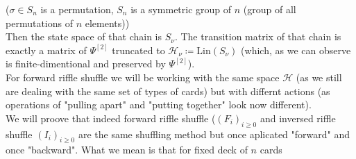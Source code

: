 \documentclass[a4paper, 12pt]{report}
\begin{document}
($\sigma \in S_n$ is a permutation, $S_n$ is a symmetric group of $n$ (group of 
all permutations of $n$ elements))\\
Then the state space of that chain is $S_\nu$. The transition matrix of that chain is exactly a matrix of 
$\Psi^{[2]}$ truncated to $\mathcal{H}_\nu \coloneqq \mathrm{Lin}(S_\nu)$ 
(which, as we can observe is finite-dimentional and preserved by $\Psi^{[2]}$). \\[8pt]
For forward riffle shuffle we will be working with the same space $\mathcal{H}$ (as we still 
are dealing with the same set of types of cards) but with differnt actions (as operations of "pulling apart" 
and "putting together" look now different). \\
We will proove that indeed forward riffle shuffle ($(F_i)_{i \geq 0}$ and inversed riffle shuffle 
$(I_i)_{i \geq 0}$ are the same shuffling method 
but once aplicated "forward" and once "backward". What we mean is that for fixed deck of $n$ cards 
\end{document}
